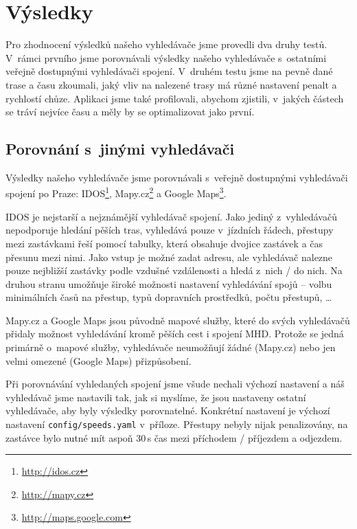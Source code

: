 \chapter{Výsledky}
Pro zhodnocení výsledků našeho vyhledávače jsme provedli dva druhy testů.
V~rámci prvního jsme porovnávali výsledky našeho vyhledávače s~ostatními veřejně
dostupnými vyhledávači spojení. V~druhém testu jsme na pevně dané trase a času
zkoumali, jaký vliv na nalezené trasy má různé nastavení penalt a rychlostí
chůze. Aplikaci jsme také profilovali, abychom zjistili, v~jakých částech se
tráví nejvíce času a měly by se optimalizovat jako první.

\section{Porovnání s~jinými vyhledávači}
Výsledky našeho vyhledávače jsme porovnávali s~veřejně dostupnými vyhledávači
spojení po Praze: IDOS\footnote{\url{http://idos.cz}},
Mapy.cz\footnote{\url{http://mapy.cz}} a Google
Maps\footnote{\url{http://maps.google.com}}. 

IDOS je nejstarší a nejznámější vyhledávač spojení. Jako jediný z~vyhledávačů
nepodporuje hledání pěších tras, vyhledává pouze v~jízdních řádech, přestupy
mezi zastávkami řeší pomocí tabulky, která obsahuje dvojice zastávek a čas
přesunu mezi nimi. Jako vstup je možné zadat adresu, ale vyhledávač nalezne
pouze nejbližší zastávky podle vzdušné vzdálenosti a hledá z~nich / do nich. 
Na druhou stranu umožňuje široké možnosti nastavení vyhledávání spojů -- volbu
minimálních časů na přestup, typů dopravních prostředků, počtu přestupů, \dots

Mapy.cz a Google Maps jsou původně mapové služby, které do svých vyhledávačů
přidaly možnost vyhledávání kromě pěších cest i spojení MHD. Protože se jedná
primárně o~mapové služby, vyhledávače neumožňují žádné (Mapy.cz) nebo jen velmi
omezené (Google Maps) přizpůsobení. 

Při porovnávání vyhledaných spojení jsme všude nechali výchozí nastavení a náš
vyhledávač jsme nastavili tak, jak si myslíme, že jsou nastaveny ostatní
vyhledávače, aby byly výsledky porovnatelné. Konkrétní nastavení je výchozí
nastavení {\tt config/speeds.yaml} v~příloze. Přestupy nebyly nijak
penalizovány, na zastávce bylo nutné mít aspoň 30\,s čas mezi příchodem /
příjezdem a odjezdem.

